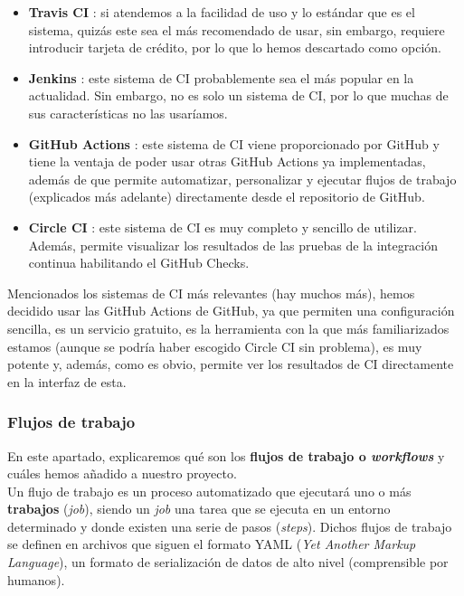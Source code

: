     \begin{itemize}
        \item \textbf{Travis CI} \cite{travis-ci}: si atendemos a la facilidad de uso y lo
        estándar que es el sistema, quizás este sea el más recomendado de usar, sin embargo,
        requiere introducir tarjeta de crédito, por lo que lo hemos descartado como opción.
        \item \textbf{Jenkins} \cite{jenkins}: este sistema de CI probablemente sea el más
        popular en la actualidad. Sin embargo, no es solo un sistema de CI, por lo
        que muchas de sus características no las usaríamos.
        \item \textbf{GitHub Actions} \cite{github-actions}: este sistema de CI viene
        proporcionado por GitHub y tiene la ventaja de poder usar otras GitHub Actions ya
        implementadas, además de que permite automatizar, personalizar y ejecutar flujos de
        trabajo (explicados más adelante) directamente desde el repositorio de GitHub.
        \item \textbf{Circle CI} \cite{circle-ci}: este sistema de CI es muy completo y
        sencillo de utilizar. Además, permite visualizar los resultados de las pruebas de la
        integración continua habilitando el GitHub Checks.
    \end{itemize}

    Mencionados los sistemas de CI más relevantes (hay muchos más), hemos decidido usar las
    GitHub Actions de GitHub, ya que permiten una configuración sencilla, es un servicio
    gratuito, es la herramienta con la que más familiarizados estamos (aunque se podría haber
    escogido Circle CI sin problema), es muy potente y, además, como es obvio, permite ver los
    resultados de CI directamente en la interfaz de esta.

\subsubsection{Flujos de trabajo}
En este apartado, explicaremos qué son los \textbf{flujos de trabajo o \textit{workflows}} y
cuáles hemos añadido a nuestro proyecto.\\

Un flujo de trabajo es un proceso automatizado que ejecutará uno o más \textbf{trabajos}
(\textit{job}), siendo un \textit{job} una tarea que se ejecuta en un entorno determinado y
donde existen una serie de pasos (\textit{steps}). Dichos flujos de trabajo se definen en
archivos que siguen el formato YAML (\textit{Yet Another Markup Language}), un formato de
serialización de datos de alto nivel (comprensible por humanos).\\

